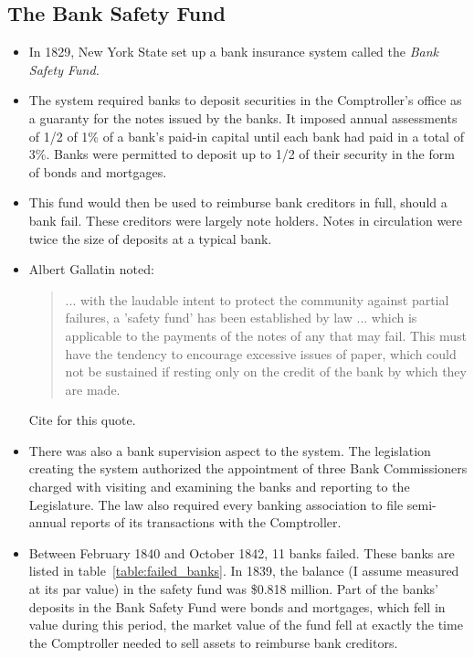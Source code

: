 \documentclass[11pt]{article}
\begin{document}
\subsection{The Bank Safety Fund}


\begin{itemize}

\item In 1829, New York State set up a bank insurance system called the {\em Bank Safety Fund.}

\item The system required banks to deposit securities in the Comptroller’s 
office as a guaranty for the notes issued by the banks.  It imposed annual 
assessments of 1/2 of 1\% of a bank's paid-in capital until each bank had 
paid in a total of 3\%. Banks were permitted to deposit up to 1/2 of their 
security in the form of bonds and mortgages.  

\item This fund would then be used to reimburse bank creditors in full, should a bank 
fail. These creditors were largely note holders.  Notes in circulation were 
twice the size of deposits at a typical bank.

\item Albert Gallatin noted:
\begin{quote}
... with the laudable intent to protect the community against partial
failures, a 'safety fund' has been established by law ... which is applicable
to the payments of the notes of any that may fail. This must
have the tendency to encourage excessive issues of paper, which could not be
sustained if resting only on the credit of the bank by which
they are made.
\end{quote}
Cite \cite{Bodenhorn_1996} for this quote.

\item There was also a bank supervision aspect to the system.  The 
legislation creating the system authorized the appointment of three Bank 
Commissioners charged with visiting and examining the banks and reporting to 
the Legislature.  The law also required every banking association to file 
semi-annual reports of its transactions with the Comptroller. 

\item Between February 1840 and October 1842, 11 banks failed.  These banks 
are listed in table~\ref{table:failed_banks}. In 1839, the balance (I assume 
measured at its par value) in the safety fund was \$0.818 million. Part of 
the banks' deposits in the Bank Safety Fund were bonds and mortgages, which 
fell in value during this period, the market value of the fund fell at 
exactly the time the Comptroller needed to sell assets to reimburse bank 
creditors.


\end{itemize}
\end{document}
